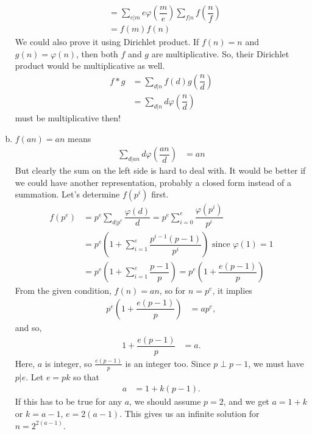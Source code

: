 \documentclass[problems.tex]{subfile}
\begin{document}
\begin{solution}
\begin{enumerate}[(a)]
\begin{align*}
								  & = \sum_{e|m}e\varphi\left(\dfrac{m}{e}\right)\sum_{f|n}f\left(\dfrac{n}{f}\right)\\
								  & = f(m)f(n)
						\end{align*}
					We could also prove it using Dirichlet product. If $f(n)=n$ and $g(n)=\varphi(n)$, then both $f$ and $g$ are multiplicative. So, their Dirichlet product would be multiplicative as well.
						\begin{align*}
							f\ast g & = \sum_{d|n}f(d)g\left(\dfrac{n}{d}\right)\\
									& = \sum_{d|n}d\varphi\left(\dfrac{n}{d}\right)
						\end{align*}
					must be multiplicative then!
				\item $f(an)=an$ means
						\begin{align*}
							\sum_{d|an}d\varphi\left(\dfrac{an}{d}\right) & = an
						\end{align*}
					But clearly the sum on the left side is hard to deal with. It would be better if we could have another representation, probably a closed form instead of a summation. Let's determine $f(p^i)$ first.
						\begin{align*}
							f(p^e)  & = p^e\sum_{d|p^e}\dfrac{\varphi(d)}{d} = p^e\sum_{i=0}^{e}\dfrac{\varphi(p^i)}{p^i}\\
									& = p^e\left(1+\sum_{i=1}^{e}\dfrac{p^{i-1}(p-1)}{p^i}\right)\mbox{ since }\varphi(1)=1\\
									& = p^e\left(1+\sum_{i=1}^{e}\dfrac{p-1}{p}\right)= p^e\left(1+\dfrac{e(p-1)}{p}\right)
						\end{align*}
					From the given condition, $f(n) = an$, so for $n=p^e$, it implies
						\begin{align*}
							p^e\left(1+\dfrac{e(p-1)}{p}\right) & = ap^e,
						\end{align*}
					and so,
						\begin{align*}
							1+\dfrac{e(p-1)}{p} & = a.
						\end{align*}
					Here, $a$ is integer, so $\frac{e(p-1)}{p}$ is an integer too. Since $p\perp p-1$, we must have $p|e$. Let $e=pk$ so that
						\begin{align*}
							a & = 1+k(p-1).
						\end{align*}
					If this has to be true for any $a$, we should assume $p=2$, and we get $a=1+k$ or $k=a-1$, $e=2(a-1)$. This gives us an infinite solution for $n=2^{2(a-1)}$.
			\end{enumerate}
	\end{solution}
	
\end{document}
